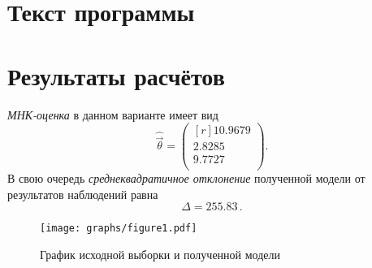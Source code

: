 \section{Текст программы}




\section{Результаты расчётов}
\emph{МНК-оценка} в данном варианте имеет вид
\begin{equation}
    \hat{\vec{\theta}} = \begin{pmatrix*}[r]
        10.9679  \\
        2.8285  \\
        9.7727 \\
    \end{pmatrix*}.
\end{equation}
В свою очередь \emph{среднеквадратичное отклонение} полученной модели от результатов наблюдений равна
\begin{equation}
    \Delta = 255.83\,.
\end{equation}

\begin{figure}[h]
    \centering
    \texttt{[image: graphs/figure1.pdf]}
    \caption{График исходной выборки и полученной модели}
\end{figure}